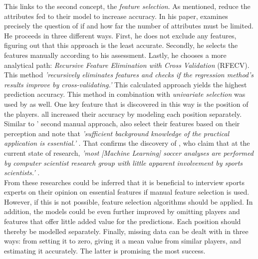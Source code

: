 \indent This links to the second concept, the \emph{feature selection}. As mentioned, \citet{deng_analysis_2020,egidi_bayesian_2018} reduce the attributes fed to their model to increase accuracy. In his paper, \citet{lutz_fantasy_2015} examines precisely the question of if and how far the number of attributes must be limited. He proceeds in three different ways. First, he does not exclude any features, figuring out that this approach is the least accurate. Secondly, he selects the features manually according to his assessment. Lastly, he chooses a more analytical path: \emph{Recursive Feature Elimination with Cross Validation} (RFECV). This method \emph{'recursively eliminates features and checks if the regression method's results improve by cross-validating.'} \parencite[, p. 4]{lutz_fantasy_2015} This calculated approach yields the highest prediction accuracy. This method in combination with \emph{univariate selection} was used by \citet{anik_players_2018} as well. One key feature that is discovered in this way is the position of the players. \citet{lutz_fantasy_2015,demediuk_performance_2021,egidi_bayesian_2018} all increased their accuracy by modeling each position separately. Similar to \citeauthor{lutz_fantasy_2015}' second manual approach, \citeauthor{deng_analysis_2020} also select their features based on their perception and note that \emph{'sufficient background knowledge of the practical application is essential.'} \parencite[, p. 4]{deng_analysis_2020}. That confirms the discovery of \citeauthor{rein_big_2016}, who claim that at the current state of research, \emph{'most [Machine Learning] soccer analyses are performed by computer scientist research group with little apparent involvement by sports scientists.'} \parencite[, p. 6]{rein_big_2016}. \\
\indent From these researches could be inferred that it is beneficial to interview sports experts on their opinion on essential features if manual feature selection is used. However, if this is not possible, feature selection algorithms should be applied. In addition, the models could be even further improved by omitting players and features that offer little added value for the predictions. Each position should thereby be modelled separately. Finally, missing data can be dealt with in three ways: from setting it to zero, giving it a mean value from similar players, and estimating it accurately. The latter is promising the most success.

